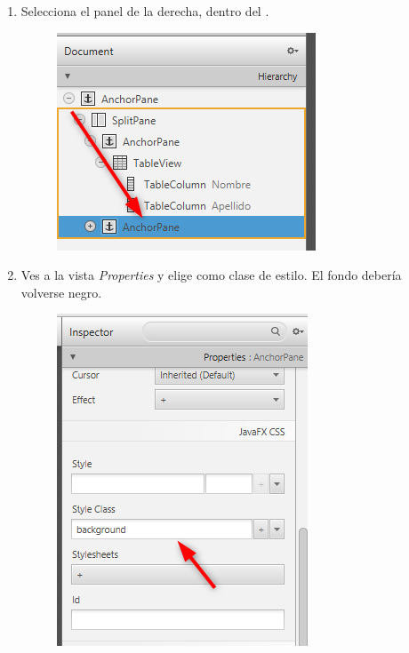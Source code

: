 \begin{enumerate}
    \item Selecciona el panel  de la derecha, dentro del .
    \begin{figure}[H]
        \includegraphics{img/6-7-AnchorPane.png}
    \end{figure}
    \item Ves a la vista \textit{Properties} y elige  como clase de estilo. 
    El fondo debería volverse negro.
    \begin{figure}[H]
        \includegraphics{img/6-8-BackGround.png}
    \end{figure}
\end{enumerate}

